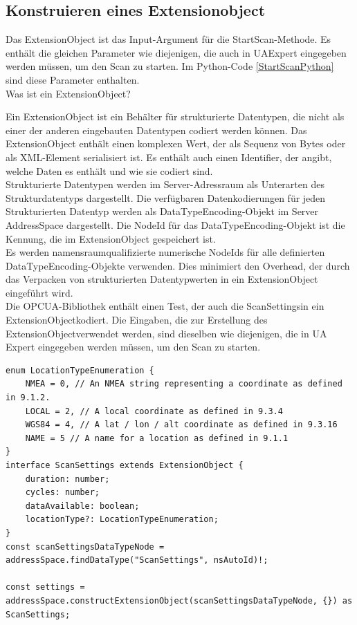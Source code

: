 \subsection*{Konstruieren eines Extensionobject}

Das ExtensionObject ist das Input-Argument für die StartScan-Methode. Es enthält die gleichen Parameter wie diejenigen, die auch in UAExpert eingegeben werden müssen, um den Scan zu starten. Im Python-Code \ref{StartScanPython} sind diese Parameter enthalten.\\

Was ist ein ExtensionObject?

Ein ExtensionObject ist ein Behälter für strukturierte Datentypen, die nicht als einer der anderen eingebauten Datentypen codiert werden können. Das ExtensionObject enthält einen komplexen Wert, der als Sequenz von Bytes oder als XML-Element serialisiert ist. Es enthält auch einen Identifier, der angibt, welche Daten es enthält und wie sie codiert sind.\\

Strukturierte Datentypen werden im Server-Adressraum als Unterarten des Strukturdatentyps dargestellt. Die verfügbaren Datenkodierungen für jeden Strukturierten Datentyp werden als DataTypeEncoding-Objekt im Server AddressSpace dargestellt. Die NodeId für das DataTypeEncoding-Objekt ist die Kennung, die im ExtensionObject gespeichert ist.\\

Es werden namensraumqualifizierte numerische NodeIds für alle definierten DataTypeEncoding-Objekte verwenden. Dies minimiert den Overhead, der durch das Verpacken von strukturierten Datentypwerten in ein ExtensionObject eingeführt wird.\\

Die OPCUA-Bibliothek enthält einen Test, der auch die \dq ScanSettings\dq  in ein \dq ExtensionObject\dq  kodiert. Die Eingaben, die zur Erstellung des \dq ExtensionObject\dq  verwendet werden, sind dieselben wie diejenigen, die in UA Expert eingegeben werden müssen, um den Scan zu starten.\\

\begin{lstlisting}[style=JavaScript, caption={ExtensionObject ScanSettings Test}]
enum LocationTypeEnumeration {
    NMEA = 0, // An NMEA string representing a coordinate as defined in 9.1.2.
    LOCAL = 2, // A local coordinate as defined in 9.3.4
    WGS84 = 4, // A lat / lon / alt coordinate as defined in 9.3.16
    NAME = 5 // A name for a location as defined in 9.1.1
}
interface ScanSettings extends ExtensionObject {
    duration: number;
    cycles: number;
    dataAvailable: boolean;
    locationType?: LocationTypeEnumeration;
}
const scanSettingsDataTypeNode = addressSpace.findDataType("ScanSettings", nsAutoId)!;

const settings = addressSpace.constructExtensionObject(scanSettingsDataTypeNode, {}) as ScanSettings;
\end{lstlisting}


